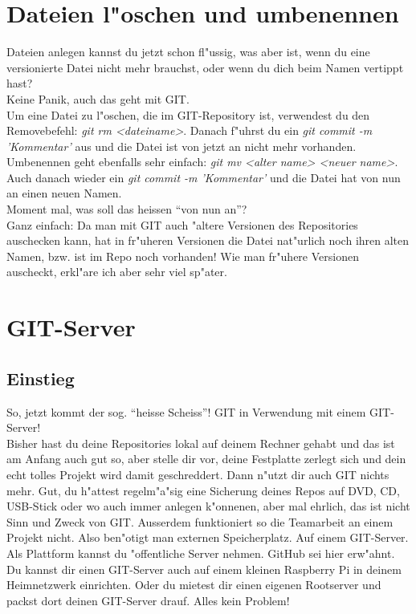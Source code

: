 \documentclass[german,a4paper]{report}
\begin{document}
\chapter{Dateien l"oschen und umbenennen}
Dateien anlegen kannst du jetzt schon fl"ussig, was aber ist, wenn du eine versionierte Datei
nicht mehr brauchst, oder wenn du dich beim Namen vertippt hast?\\
Keine Panik, auch das geht mit GIT.\\
Um eine Datei zu l"oschen, die im GIT-Repository ist, verwendest du den Removebefehl:
\textit{git rm <dateiname>}. Danach f"uhrst du ein \textit{git commit -m 'Kommentar'} aus und die
Datei ist von jetzt an nicht mehr vorhanden.\\
Umbenennen geht ebenfalls sehr einfach: \textit{git mv <alter name> <neuer name>}. Auch danach
wieder ein \textit{git commit -m 'Kommentar'} und die Datei hat von nun an einen neuen
Namen.\\
Moment mal, was soll das heissen ``von nun an''?\\
Ganz einfach: Da man mit GIT auch "altere Versionen des Repositories auschecken kann, hat in
fr"uheren Versionen die Datei nat"urlich noch ihren alten Namen, bzw. ist im Repo noch
vorhanden! Wie man fr"uhere Versionen auscheckt, erkl"are ich aber sehr viel sp"ater.

\chapter{GIT-Server}

\section{Einstieg}
So, jetzt kommt der sog. ``heisse Scheiss''! GIT in Verwendung mit einem GIT-Server!\\
Bisher hast du deine Repositories lokal auf deinem Rechner gehabt und das ist am Anfang
auch gut so, aber stelle dir vor, deine Festplatte zerlegt sich und dein echt tolles
Projekt wird damit geschreddert. Dann n"utzt dir auch GIT nichts mehr. Gut, du h"attest
regelm"a"sig eine Sicherung deines Repos auf DVD, CD, USB-Stick oder wo auch immer anlegen
k"onnenen, aber mal ehrlich, das ist nicht Sinn und Zweck von GIT. Ausserdem funktioniert
so die Teamarbeit an einem Projekt nicht.
Also ben"otigt man externen Speicherplatz. Auf einem GIT-Server.\\
Als Plattform kannst du "offentliche Server nehmen. GitHub sei hier erw"ahnt.\\
Du kannst dir einen GIT-Server auch auf einem kleinen Raspberry Pi in deinem Heimnetzwerk
einrichten. Oder du mietest dir einen eigenen Rootserver und packst dort deinen GIT-Server
drauf. Alles kein Problem!
\end{document}
